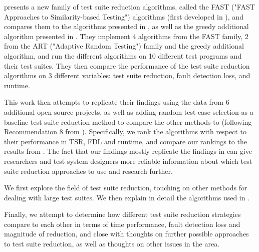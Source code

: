 \cite{cruciani2019scalable} presents a new family of test
suite reduction algorithms, called the FAST ("FAST Approaches
to Similarity-based Testing") algorithms (first developed in
\cite{miranda2018fast}), and compares them to the algorithms presented
in \cite{chen2010adaptive}, as well as the greedy additional algorithm
presented in \cite{rothermel2001prioritizing}. They implement 4 algorithms
from the FAST family, 2 from the ART ("Adaptive Random Testing") family
and the greedy additional algorithm, and run the different algorithms
on 10 different test programs and their test suites. They then compare
the performance of the test suite reduction algorithms on 3 different
variables: test suite reduction, fault detection loss, and runtime.

This work then attempts to replicate their findings using the data
from 6 additional open-source projects, as well as adding random
test case selection as a baseline test suite reduction method
to compare the other methods to (following Recommendation 8 from
\cite{khan2018systematic}). Specifically, we rank the algorithms with
respect to their performance in TSR, FDL and runtime, and compare our
rankings to the results from \cite{cruciani2019scalable}. The fact that
our findings mostly replicate the findings in \cite{cruciani2019scalable}
can give researchers and test system designers more reliable information
about which test suite reduction approaches to use and research further.

We first explore the field of test suite reduction, touching on other
methods for dealing with large test suites. We then explain in detail
the algorithms used in \cite{cruciani2019scalable}.

Finally, we attempt to determine how different test suite reduction
strategies compare to each other in terms of time performance, fault
detection loss and magnitude of reduction, and close with thoughts on
further possible approaches to test suite reduction, as well as thoughts
on other issues in the area.
